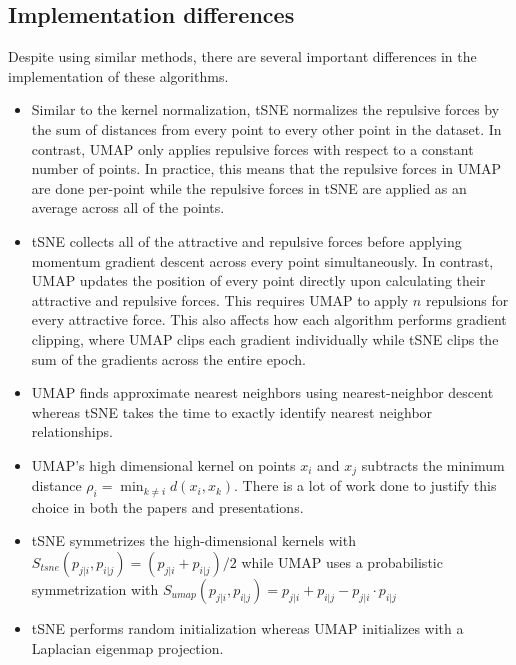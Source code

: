 \documentclass{article}
\theoremstyle{definition}
\begin{document}
\begin{multicols}{2}
\subsection{Implementation differences}
Despite using similar methods, there are several important differences in the implementation of these algorithms.

\begin{itemize}
    \item Similar to the kernel normalization, tSNE normalizes the repulsive forces by the sum of distances from every point to every other point in the
        dataset. In contrast, UMAP only applies repulsive forces with respect to a constant number of points. In practice, this means that the repulsive forces in UMAP are done per-point while the repulsive forces in tSNE are applied as an average across all of the points.

    \item tSNE collects all of the attractive and repulsive forces before applying momentum gradient descent across every point simultaneously. In contrast,
        UMAP updates the position of every point directly upon calculating their attractive and repulsive forces. This requires UMAP to apply $n$ repulsions for
        every attractive force. This also affects how each algorithm performs gradient clipping, where UMAP clips each gradient individually while tSNE clips
        the sum of the gradients across the entire epoch.

    \item UMAP finds approximate nearest neighbors using nearest-neighbor descent whereas tSNE takes the time to exactly identify nearest neighbor relationships.

    \item UMAP's high dimensional kernel on points $x_i$ and $x_j$ subtracts the minimum distance $\rho_i = \min_{k \neq i} d(x_i, x_k)$. There is a lot of
        work done to justify this choice in both the papers and presentations. 

    \item tSNE symmetrizes the high-dimensional kernels with $S_{tsne}(p_{j|i}, p_{i|j}) = (p_{j|i} + p_{i|j}) / 2$ while UMAP uses a probabilistic
        symmetrization with $S_{umap}(p_{j|i}, p_{i|j}) = p_{j|i} + p_{i|j} - p_{j|i} \cdot p_{i|j}$

    \item tSNE performs random initialization whereas UMAP initializes with a Laplacian eigenmap projection.
        

\end{itemize}
\end{multicols}
\end{document}
